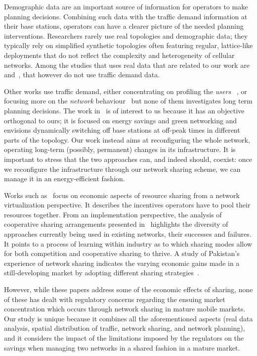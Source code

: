 \documentclass[10pt,journal,cspaper,compsoc]{IEEEtran}
\begin{document}
Demographic data are an important source of information for operators to make planning decisions.
Combining such data with the traffic demand information at their base stations, operators can have a clearer 
picture of the needed planning interventions.
Researchers rarely use real topologies and demographic data; they typically rely on simplified synthetic 
topologies often featuring regular, lattice-like deployments that do not reflect the complexity and heterogeneity 
of cellular networks.
Among the studies that uses real data that are related to our work are~\cite{kibilda2013} and~\cite{hua2012}, 
that however do not use traffic demand data.

Other works use traffic demand, either concentrating on profiling the \emph{users}~
\cite{shafiq2012,keralapura2010,paul2011}, or focusing more on the \emph{network} behaviour~
\cite{peng2011,willkomm2008,paul2011,paul2012} but none of them investigates long term planning decisions.
The work in~\cite{peng2011} is of interest to us because it has an objective orthogonal to ours;
it is focused on energy savings and green networking and envisions dynamically switching off base stations at 
off-peak times in different parts of the topology.
Our work instead aims at reconfiguring the whole network, operating long-term (possibly, permanent) changes in 
its infrastructure.
It is important to stress that the two approaches can, and indeed should, coexist: once we reconfigure the 
infrastructure through our network sharing scheme, we can manage it in an energy-efficient fashion.

Works such as~\cite{coucoubertin2012} focus on economic aspects of resource sharing from a network virtualization perspective. It describes the incentives operators have to pool their resources together.
From an implementation perspective, the analysis of cooperative sharing arrangements presented in~\cite{Coopetition} highlights the diversity of approaches currently being used in existing networks, their successes and failures. It points to a process of learning within industry as to which sharing modes allow for both competition and cooperative sharing to thrive. A study of Pakistan's experience of network sharing indicates the varying economic gains made in a still-developing market by adopting different sharing strategies~\cite{pakistan}. 

However, while these papers address some of the economic effects of sharing, none of these has dealt with regulatory concerns regarding the ensuing market concentration which occurs through network sharing in mature mobile markets. Our study is unique because it combines all the aforementioned aspects (real data analysis, spatial distribution of traffic, network sharing, and network planning), and it considers the impact of the limitations imposed by the regulators on the savings when managing two networks in a shared fashion in a mature market.
\end{document}
